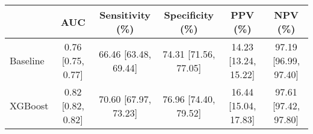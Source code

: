 \begin{tabular}{l|ccccc}
\toprule
 & AUC & Sensitivity (\%) & Specificity (\%) & PPV (\%) & NPV (\%) \\
\midrule
Baseline &  0.76 [0.75, 0.77] &  66.46 [63.48, 69.44] &  74.31 [71.56, 77.05] &  14.23 [13.24, 15.22] &  97.19 [96.99, 97.40] \\
XGBoost &  0.82 [0.82, 0.82] &  70.60 [67.97, 73.23] &  76.96 [74.40, 79.52] &  16.44 [15.04, 17.83] &  97.61 [97.42, 97.80] \\
\bottomrule
\end{tabular}
